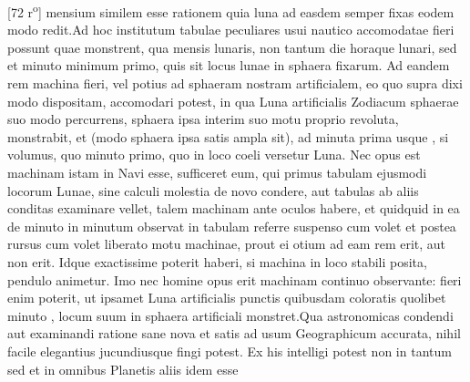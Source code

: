 [72 r\textsuperscript{o}] mensium similem esse rationem quia luna\protect{} ad  easdem semper fixas\protect{} eodem modo redit.\pend \pstart Ad hoc institutum tabulae peculiares usui nautico accomodatae fieri possunt quae monstrent, qua mensis lunaris, non tantum die horaque lunari, sed et minuto minimum primo, quis sit locus lunae\protect{} in sphaera fixarum\protect{}. Ad eandem rem machina fieri, vel potius ad sphaeram nostram artificialem, eo quo supra dixi modo dispositam, accomodari potest, in qua Luna\protect{} artificialis Zodiacum\protect{} sphaerae suo modo  percurrens, sphaera ipsa interim suo motu proprio revoluta, monstrabit, et (modo sphaera ipsa satis ampla sit), ad minuta prima usque , si volumus, quo minuto primo, quo in loco coeli versetur Luna\protect{}. Nec opus est machinam  istam in Navi\protect{} esse, sufficeret eum, qui primus tabulam ejusmodi locorum Lunae\protect{}, sine calculi molestia de novo condere, aut tabulas ab aliis conditas examinare vellet, talem machinam ante oculos habere, et quidquid in ea de minuto in minutum observat in tabulam referre suspenso cum volet et postea rursus cum volet liberato motu machinae, prout ei otium ad eam rem  erit, aut non erit. Idque exactissime poterit haberi, si machina in loco stabili posita, pendulo\protect{} animetur. Imo nec homine opus erit machinam continuo observante: fieri enim poterit, ut ipsamet Luna\protect{} artificialis punctis quibusdam coloratis quolibet minuto , locum suum in sphaera artificiali monstret.\pend \pstart Qua  astronomicas condendi aut  examinandi ratione sane nova et satis ad usum Geographicum accurata, nihil facile  elegantius jucundiusque fingi potest. \pend \pstart Ex his intelligi potest non in \protect{} tantum sed et in omnibus Planetis aliis idem esse 